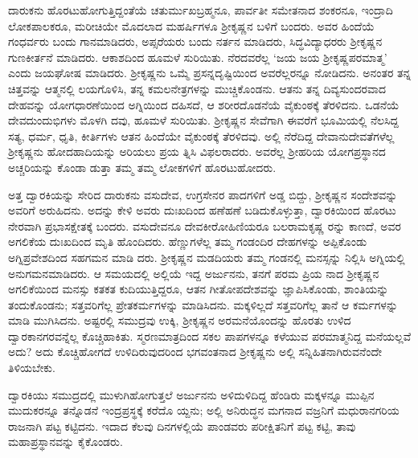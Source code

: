 ದಾರುಕನು ಹೊರಟುಹೋಗುತ್ತಿದ್ದಂತೆಯೆ ಚತುರ್ಮುಖಬ್ರಹ್ಮನೂ, ಪಾರ್ವತೀ ಸಮೇತನಾದ ಶಂಕರನೂ, ಇಂದ್ರಾದಿ ಲೋಕಪಾಲಕರೂ, ಮರೀಚಿಯೇ ಮೊದಲಾದ ಮಹರ್ಷಿಗಳೂ ಶ್ರೀಕೃಷ್ಣನ ಬಳಿಗೆ ಬಂದರು. ಅವರ ಹಿಂದೆಯೆ ಗಂಧರ್ವರು ಬಂದು ಗಾನಮಾಡಿದರು, ಅಪ್ಸರೆಯರು ಬಂದು ನರ್ತನ ಮಾಡಿದರು, ಸಿದ್ಧವಿದ್ಯಾಧರರು ಶ್ರೀಕೃಷ್ಣನ ಗುಣಕೀರ್ತನೆ ಮಾಡಿದರು. ಆಕಾಶದಿಂದ ಹೂಮಳೆ ಸುರಿಯಿತು. ನೆರದವರೆಲ್ಲ ‘ಜಯ ಜಯ ಶ್ರೀಕೃಷ್ಣಪರಮಾತ್ಮ’ ಎಂದು ಜಯಘೋಷ ಮಾಡಿದರು. ಶ್ರೀಕೃಷ್ಣನು ಒಮ್ಮೆ ಪ್ರಸನ್ನದೃಷ್ಟಿಯಿಂದ ಅವರೆಲ್ಲರನ್ನೂ ನೋಡಿದನು. ಅನಂತರ ತನ್ನ ಚಿತ್ತವನ್ನು ಆತ್ಮನಲ್ಲಿ ಲಯಗೊಳಿಸಿ, ತನ್ನ ಕಮಲನೇತ್ರಗಳನ್ನು ಮುಚ್ಚಿಕೊಂಡನು. ಆತನು ತನ್ನ ದಿವ್ಯಸುಂದರವಾದ ದೇಹವನ್ನು ಯೋಗಧಾರಣೆಯಿಂದ ಅಗ್ನಿಯಿಂದ ದಹಿಸದೆ, ಆ ಶರೀರದೊಡನೆಯೆ ವೈಕುಂಠಕ್ಕೆ ತೆರಳಿದನು. ಒಡನೆಯೆ ದೇವದುಂದುಭಿಗಳು ಮೊಳಗಿ ದವು, ಹೂಮಳೆ ಸುರಿಯಿತು. ಶ್ರೀಕೃಷ್ಣನ ಸೇವೆಗಾಗಿ ಈವರೆಗೆ ಭೂಮಿಯಲ್ಲಿ ನೆಲಸಿದ್ದ ಸತ್ಯ, ಧರ್ಮ, ಧೃತಿ, ಕೀರ್ತಿಗಳು ಆತನ ಹಿಂದೆಯೇ ವೈಕುಂಠಕ್ಕೆ ತೆರಳಿದವು. ಅಲ್ಲಿ ನೆರೆದಿದ್ದ ದೇವಾನುದೇವತೆಗಳೆಲ್ಲ ಶ್ರೀಕೃಷ್ಣನು ಹೋದಹಾದಿಯನ್ನು ಅರಿಯಲು ಪ್ರಯ ತ್ನಿಸಿ ವಿಫಲರಾದರು. ಅವರೆಲ್ಲ ಶ್ರೀಹರಿಯ ಯೋಗಪ್ರಸ್ಥಾನದ ಅಚ್ಚರಿಯನ್ನು ಕೊಂಡಾ ಡುತ್ತಾ ತಮ್ಮ ತಮ್ಮ ಲೋಕಗಳಿಗೆ ಹೊರಟುಹೋದರು.

ಅತ್ತ ದ್ವಾರಕಿಯನ್ನು ಸೇರಿದ ದಾರುಕನು ವಸುದೇವ, ಉಗ್ರಸೇನರ ಪಾದಗಳಿಗೆ ಅಡ್ಡ ಬಿದ್ದು, ಶ್ರೀಕೃಷ್ಣನ ಸಂದೇಶವನ್ನು ಅವರಿಗೆ ಅರುಹಿದನು. ಅದನ್ನು ಕೇಳಿ ಅವರು ದುಃಖದಿಂದ ಹಣೆಹಣೆ ಬಡಿದುಕೊಳ್ಳುತ್ತಾ, ದ್ವಾರಕಿಯಿಂದ ಹೊರಟು ನೇರವಾಗಿ ಪ್ರಭಾಸಕ್ಷೇತಕ್ಕೆ ಬಂದರು. ವಸುದೇವನೂ ದೇವಕೀರೋಹಿಣಿಯರೂ ಬಲರಾಮಕೃಷ್ಣ ರನ್ನು ಕಾಣದೆ, ಅವರ ಅಗಲಿಕೆಯ ದುಃಖದಿಂದ ಮೃತಿ ಹೊಂದಿದರು. ಹೆಣ್ಣುಗಳೆಲ್ಲ ತಮ್ಮ ಗಂಡಂದಿರ ದೇಹಗಳನ್ನು ಅಪ್ಪಿಕೊಂಡು ಅಗ್ನಿಪ್ರವೇಶದಿಂದ ಸಹಗಮನ ಮಾಡಿ ದರು. ಶ್ರೀಕೃಷ್ಣನ ಮಡದಿಯರು ತಮ್ಮ ಗಂಡನಲ್ಲಿ ಮನಸ್ಸನ್ನು ನಿಲ್ಲಿಸಿ ಅಗ್ನಿಯಲ್ಲಿ ಅನುಗಮನಮಾಡಿದರು. ಆ ಸಮಯದಲ್ಲಿ ಅಲ್ಲಿಯೆ ಇದ್ದ ಅರ್ಜುನನು, ತನಗೆ ಪರಮ ಪ್ರಿಯ ನಾದ ಶ್ರೀಕೃಷ್ಣನ ಅಗಲಿಕೆಯಿಂದ ಮನಸ್ಸು ಕತಕತ ಕುದಿಯುತ್ತಿದ್ದರೂ, ಆತನ ಗೀತೋಪದೇಶವನ್ನು ಜ್ಞಾಪಿಸಿಕೊಂಡು, ಶಾಂತಿಯನ್ನು ತಂದುಕೊಂಡನು; ಸತ್ತವರಿಗೆಲ್ಲ ಪ್ರೇತಕರ್ಮಗಳನ್ನು ಮಾಡಿಸಿದನು. ಮಕ್ಕಳಿಲ್ಲದೆ ಸತ್ತವರಿಗೆಲ್ಲ ತಾನೆ ಆ ಕರ್ಮಗಳನ್ನು ಮಾಡಿ ಮುಗಿಸಿದನು. ಅಷ್ಟರಲ್ಲಿ ಸಮುದ್ರವು ಉಕ್ಕಿ, ಶ್ರೀಕೃಷ್ಣನ ಅರಮನೆಯೊಂದನ್ನು ಹೊರತು ಉಳಿದ ದ್ವಾರಕಾನಗರವನ್ನೆಲ್ಲ ಕೊಚ್ಚಿಹಾಕಿತು. ಸ್ಮರಣಮಾತ್ರದಿಂದ ಸಕಲ ಪಾಪಗಳನ್ನೂ ಕಳೆಯುವ ಪರಮಾತ್ಮನಿದ್ದ ಮನೆಯಲ್ಲವೆ ಅದು? ಅದು ಕೊಚ್ಚಿಹೋಗದೆ ಉಳಿದಿರುವುದರಿಂದ ಭಗವಂತನಾದ ಶ್ರೀಕೃಷ್ಣನು ಅಲ್ಲಿ ಸನ್ನಿಹಿತನಾಗಿರುವನೆಂದೇ ತಿಳಿಯಬೇಕು.

ದ್ವಾರಕಿಯು ಸಮುದ್ರದಲ್ಲಿ ಮುಳುಗಿಹೋಗುತ್ತಲೆ ಅರ್ಜುನನು ಅಳಿದುಳಿದಿದ್ದ ಹೆಂಡಿರು ಮಕ್ಕಳನ್ನೂ ಮುಪ್ಪಿನ ಮುದುಕರನ್ನೂ ತನ್ನೊಡನೆ ಇಂದ್ರಪ್ರಸ್ಥಕ್ಕೆ ಕರೆದೊ ಯ್ದನು; ಅಲ್ಲಿ ಅನಿರುದ್ಧನ ಮಗನಾದ ವಜ್ರನಿಗೆ ಮಧುರಾನಗರಿಯ ರಾಜನಾಗಿ ಪಟ್ಟ ಕಟ್ಟಿದನು. ಇದಾದ ಕೆಲವು ದಿನಗಳಲ್ಲಿಯೆ ಪಾಂಡವರು ಪರೀಕ್ಷಿತನಿಗೆ ಪಟ್ಟ ಕಟ್ಟಿ, ತಾವು ಮಹಾಪ್ರಸ್ಥಾನವನ್ನು ಕೈಕೊಂಡರು.

